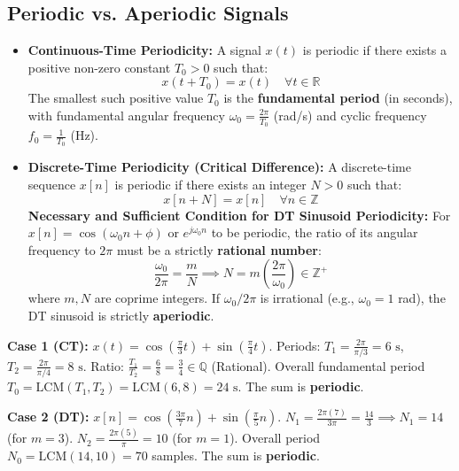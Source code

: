 \documentclass[12pt,a4paper]{article}
\begin{document}
\subsection{Periodic vs. Aperiodic Signals}
\begin{tcolorbox}[defbox, title={\textbf{Periodicity Criteria in Continuous and Discrete Time}}]
\begin{itemize}[leftmargin=*, itemsep=4pt]
  \item \textbf{Continuous-Time Periodicity:} A signal $x(t)$ is periodic if there exists a positive non-zero constant $T_0 > 0$ such that:
  \begin{equation}
    x(t + T_0) = x(t) \quad \forall t \in \mathbb{R}
  \end{equation}
  The smallest such positive value $T_0$ is the \textbf{fundamental period} (in seconds), with fundamental angular frequency $\omega_0 = \frac{2\pi}{T_0}$ (rad/s) and cyclic frequency $f_0 = \frac{1}{T_0}$ (Hz).
  \item \textbf{Discrete-Time Periodicity (Critical Difference):} A discrete-time sequence $x[n]$ is periodic if there exists an integer $N > 0$ such that:
  \begin{equation}
    x[n + N] = x[n] \quad \forall n \in \mathbb{Z}
  \end{equation}
  \textbf{Necessary and Sufficient Condition for DT Sinusoid Periodicity:} For $x[n] = \cos(\omega_0 n + \phi)$ or $e^{j\omega_0 n}$ to be periodic, the ratio of its angular frequency to $2\pi$ must be a strictly \textbf{rational number}:
  \begin{equation}
    \frac{\omega_0}{2\pi} = \frac{m}{N} \implies N = m \left(\frac{2\pi}{\omega_0}\right) \in \mathbb{Z}^+
  \end{equation}
  where $m, N$ are coprime integers. If $\omega_0 / 2\pi$ is irrational (e.g., $\omega_0 = 1$ rad), the DT sinusoid is strictly \textbf{aperiodic}.
\end{itemize}
\end{tcolorbox}

\begin{tcolorbox}[examplebox, title={\textbf{Example: Sum of Periodic Signals in CT vs. DT}}]
\textbf{Case 1 (CT):} $x(t) = \cos\left(\frac{\pi}{3}t\right) + \sin\left(\frac{\pi}{4}t\right)$.
Periods: $T_1 = \frac{2\pi}{\pi/3} = 6\text{ s}$, $T_2 = \frac{2\pi}{\pi/4} = 8\text{ s}$.
Ratio: $\frac{T_1}{T_2} = \frac{6}{8} = \frac{3}{4} \in \mathbb{Q}$ (Rational).
Overall fundamental period $T_0 = \text{LCM}(T_1, T_2) = \text{LCM}(6, 8) = 24\text{ s}$. The sum is \textbf{periodic}.

\textbf{Case 2 (DT):} $x[n] = \cos\left(\frac{3\pi}{7}n\right) + \sin\left(\frac{\pi}{5}n\right)$.
$N_1 = \frac{2\pi(7)}{3\pi} = \frac{14}{3} \implies N_1 = 14$ (for $m=3$).
$N_2 = \frac{2\pi(5)}{\pi} = 10$ (for $m=1$).
Overall period $N_0 = \text{LCM}(14, 10) = 70$ samples. The sum is \textbf{periodic}.
\end{tcolorbox}
\end{document}
